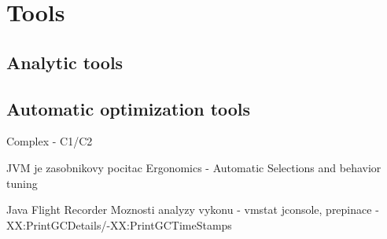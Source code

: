 \documentclass[
  digital, %
  oneside,
  notable, %
  nolof,     %
  nolot     %
]{fithesis3}
\begin{document}
\chapter{Tools}
\section{Analytic tools}
\section{Automatic optimization tools}
Complex - C1/C2


JVM je zasobnikovy pocitac
Ergonomics - Automatic Selections and behavior tuning 

Java Flight Recorder
Moznosti analyzy vykonu - vmstat jconsole, prepinace -XX:PrintGCDetails/-XX:PrintGCTimeStamps





\end{document}
